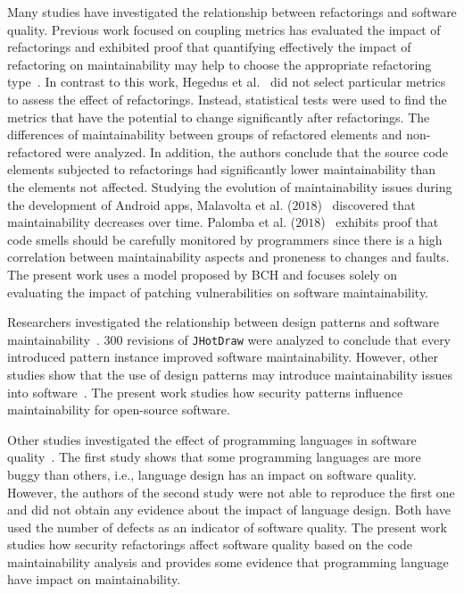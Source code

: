 \documentclass[10pt,conference]{IEEEtran}
\begin{document}
{Many studies have investigated the relationship between refactorings and
software quality. Previous work focused on coupling metrics has evaluated the
impact of refactorings and exhibited proof that quantifying effectively the
impact of refactoring on maintainability may help to choose the appropriate
refactoring type~\cite{1167822}. In contrast to this work, Hegedus et
al.~\cite{HEGEDUS2018313} did not select particular metrics to assess the effect
of refactorings. Instead, statistical tests were used to find the metrics that
have the potential to change significantly after refactorings. The differences
of maintainability between groups of refactored elements and non-refactored were
analyzed. In addition, the authors conclude that the source code elements
subjected to refactorings had significantly lower maintainability than the
elements not affected. Studying the evolution of maintainability issues during
the development of Android apps, Malavolta et al. ($2018$)~\cite{8530041}
discovered that maintainability decreases over time. Palomba et al.
($2018$)~\cite{Palomba:2018:DIM:3231288.3231337} exhibits proof that code smells
should be carefully monitored by programmers since there is a high correlation
between maintainability aspects and proneness to changes and faults. The present
work uses a model proposed by BCH and focuses solely on evaluating the impact of
patching vulnerabilities on software maintainability.

Researchers investigated the relationship between design patterns and software
maintainability~\cite{10.1007/978-3-642-35267-6-18}. $300$ revisions of
\texttt{JHotDraw} were analyzed to conclude that every introduced pattern
instance improved software maintainability. However, other studies show that the
use of design patterns may introduce maintainability issues into
software~\cite{4493325}. The present work studies how security patterns
influence maintainability for open-source software.

Other studies investigated the effect of programming languages in software
quality~\cite{Ray:2017:LSP:3144574.3126905, 2019arXiv190110220B}. The first
study shows that some programming languages are more buggy than others, i.e.,
language design has an impact on software quality. However, the authors of the
second study were not able to reproduce the first one and did not obtain any
evidence about the impact of language design. Both have used the number of
defects as an indicator of software quality. The present work studies how
security refactorings affect software quality based on the code maintainability
analysis and provides some evidence that programming language have impact on
maintainability.

}
\end{document}
